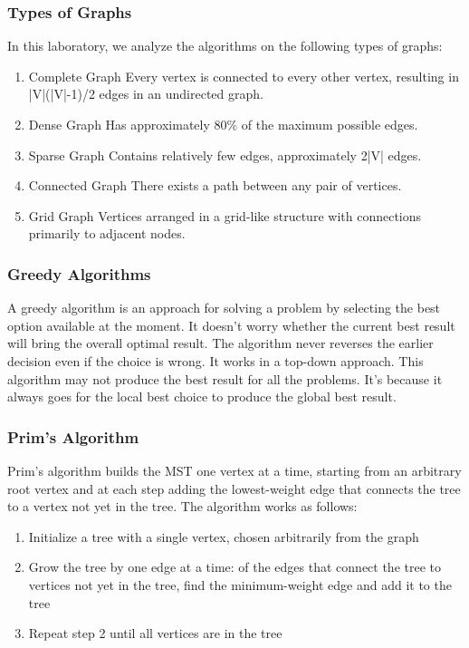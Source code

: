 \documentclass[a4paper,12pt]{article}
\begin{document}
\subsubsection{Types of Graphs}
\label{sec:org969d2c6}
In this laboratory, we analyze the algorithms on the following types of graphs:
\begin{enumerate}
\item Complete Graph
\label{sec:org1703710}
Every vertex is connected to every other vertex, resulting in |V|(|V|-1)/2 edges in an undirected graph.
\item Dense Graph
\label{sec:orgc7e2485}
Has approximately 80\% of the maximum possible edges.
\item Sparse Graph
\label{sec:org8e13bea}
Contains relatively few edges, approximately 2|V| edges.
\item Connected Graph
\label{sec:orgd8732b9}
There exists a path between any pair of vertices.
\item Grid Graph
\label{sec:org28d2315}
Vertices arranged in a grid-like structure with connections primarily to adjacent nodes.
\end{enumerate}
\subsubsection{Greedy Algorithms}
\label{sec:orgd3e3eac}
A greedy algorithm is an approach for solving a problem by selecting the best option available at the moment. It doesn't worry whether the current best result will bring the overall optimal result. The algorithm never reverses the earlier decision even if the choice is wrong. It works in a top-down approach. This algorithm may not produce the best result for all the problems. It's because it always goes for the local best choice to produce the global best result.
\subsubsection{Prim's Algorithm}
\label{sec:orgc0f5427}
Prim's algorithm builds the MST one vertex at a time, starting from an arbitrary root vertex and at each step adding the lowest-weight edge that connects the tree to a vertex not yet in the tree. The algorithm works as follows:

\begin{enumerate}
\item Initialize a tree with a single vertex, chosen arbitrarily from the graph
\item Grow the tree by one edge at a time: of the edges that connect the tree to vertices not yet in the tree, find the minimum-weight edge and add it to the tree
\item Repeat step 2 until all vertices are in the tree
\end{enumerate}
\end{document}
